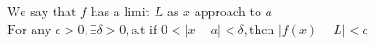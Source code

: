 \documentclass[preview]{standalone}
\begin{document}
\begin{align*}
{\text{We say that } f \text{ has a limit } L \text{ as } x \text{ approach to } a} \\\text{For any }\epsilon > 0, \exists \delta > 0, \text{s.t if } 0 < |x - a| < \delta, \text{then } |f(x) - L| < \epsilon
\end{align*}
\end{document}
